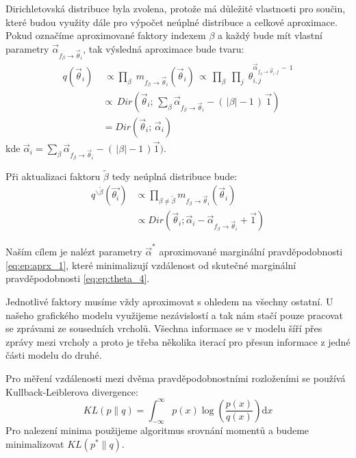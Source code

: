 Dirichletovská distribuce byla zvolena, protože má důležité vlastnosti pro
součin, které budou využity dále pro výpočet neúplné distribuce a celkové
aproximace. Pokud označíme aproximované faktory indexem $\beta$ a každý bude
mít vlastní parametry $\vec\alpha_{f_\beta \rightarrow \vec\theta_i}$, tak výsledná aproximace bude
tvaru:
\begin{align}
q(\vec{\theta}_i) \,& \, \propto
    \prod_\beta \;
    m_{f_\beta \rightarrow \vec{\theta}_i}(\vec{\theta}_i) \,
 \propto \,
    \prod_\beta \;
        \prod_j \;
            \theta_{i,j}^{\vec\alpha_{f_\beta \rightarrow \vec\theta_i, j} \,-\, 1}
\\
&\propto \,
    Dir(\vec{\theta}_i ;\, \sum_\beta \vec\alpha_{f_\beta \rightarrow \vec\theta_i} - (\,|\beta| - 1\,) \, \vec{1})
\\
&=
    Dir(\vec{\theta}_i;\,
        \vec{\alpha}_i)
\label{eq:ep:aprx_1}
\end{align}
kde $\vec{\alpha}_i = \sum_\beta \vec\alpha_{f_\beta \rightarrow \vec\theta_i} - (\,|\beta| - 1\,)
\vec{1})$.

Při aktualizaci faktoru $\tilde\beta$ tedy neúplná distribuce bude:
\begin{align}
q^{\backslash \tilde\beta} (\vec{\theta_i})
&\propto
    \prod_{\beta \ne \tilde\beta}
        m_{f_\beta \rightarrow \vec{\theta}_i}(\vec{\theta}_i)
\\
& \propto
Dir(\vec{\theta}_i;
    \vec{\alpha}_i - \vec\alpha_{f_\beta \rightarrow \vec\theta_i} + \vec{1})
\end{align}

Naším cílem je nalézt parametry $\vec{\alpha}^*$ aproximované marginální pravděpodobnosti \eqref{eq:ep:aprx_1}, které minimalizují vzdálenost od skutečné marginální pravděpodobnosti \eqref{eq:ep:theta_4}. 

Jednotlivé faktory musíme vždy aproximovat s ohledem na všechny ostatní.
U našeho grafického modelu využijeme nezávislostí a tak nám stačí pouze pracovat se zprávami ze sousedních vrcholů.
Všechna informace se v modelu šíří přes zprávy mezi vrcholy a proto je třeba několika iterací pro přesun informace z jedné části modelu do druhé.

Pro měření vzdálenosti mezi dvěma pravděpodobnostními rozloženími se používá Kullback-Leiblerova divergence:
\begin{equation}
KL(p \| q) =
\int_{-\infty}^{\infty}
    p(x) \log\left(\frac{p(x)}{q(x)}\right) \mathrm{d}x
\end{equation}
Pro nalezení minima použijeme algoritmus srovnání momentů a budeme
minimalizovat $KL(p^*\| q)$.

